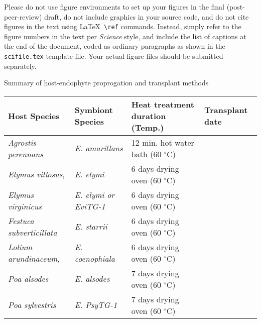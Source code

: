 \documentclass[12pt]{article}
\begin{document}



\clearpage

 Please do not use figure environments to set
up your figures in the final (post-peer-review) draft, do not include graphics in your
source code, and do not cite figures in the text using \LaTeX\
\verb+\ref+ commands.  Instead, simply refer to the figure numbers in
the text per {\it Science\/} style, and include the list of captions at
the end of the document, coded as ordinary paragraphs as shown in the
\texttt{scifile.tex} template file.  Your actual figure files should
be submitted separately.

 Summary of host-endophyte proprogation and transplant methods\\
\begin{table}[ht]
	\begin{adjustbox}{width=1\textwidth}
\begin{tabular}{llll}

	\bf{Host Species} & \bf{Symbiont Species} & \bf{Heat treatment duration (Temp.)}& \bf{Transplant date }\\
	        \hline
	\emph{Agrostis perennans} & \emph{E. amarillans}&12 min. hot water bath (60 $^{\circ}$C)&\\
	\emph{Elymus villosus}, &\emph{E. elymi}&6 days drying oven (60 $^{\circ}$C)&\\
	\emph{Elymus virginicus} &\emph{E. elymi or EviTG-1}&6 days drying oven (60 $^{\circ}$C)&\\
	 \emph{Festuca subverticillata} &\emph{E. starrii}&6 days drying oven (60 $^{\circ}$C)&\\
	 \emph{Lolium arundinaceum}, &\emph{E. coenophiala}&6 days drying oven (60 $^{\circ}$C)& \\
	 \emph{Poa alsodes} &\emph{E. alsodes}& 7 days drying oven (60 $^{\circ}$C)&\\
	 \emph{Poa sylvestris}&\emph{E. PsyTG-1}&7 days drying oven (60 $^{\circ}$C)& \\
\end{tabular}
\end{adjustbox}
\end{table}
\end{document}
